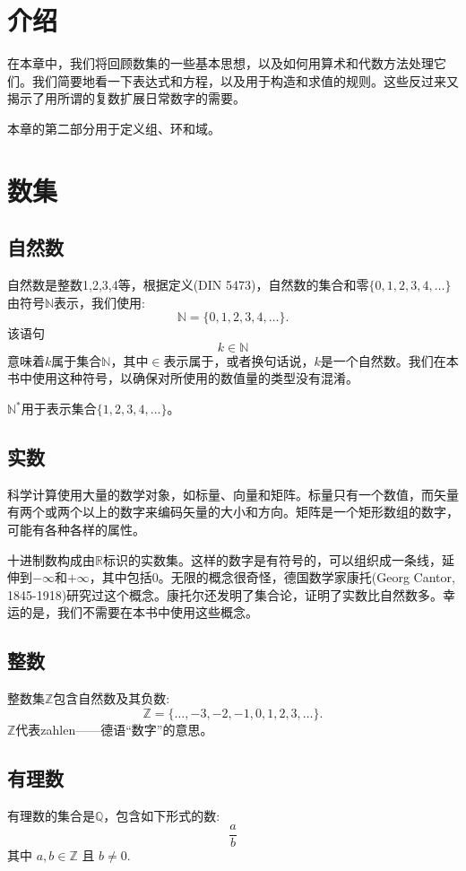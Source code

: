 \section{介绍}
在本章中，我们将回顾数集的一些基本思想，以及如何用算术和代数方法处理它们。我们简要地看一下表达式和方程，以及用于构造和求值的规则。这些反过来又揭示了用所谓的复数扩展日常数字的需要。

本章的第二部分用于定义组、环和域。

\section{数集}
\subsection{自然数}
自然数是整数1,2,3,4等，根据定义(DIN 5473)，自然数的集合和零$\{0,1,2,3,4,\ldots\}$由符号$\mathbb{N}$表示，我们使用:
$$
\mathbb{N}=\{0,1,2,3,4, \ldots\} .
$$
该语句
$$
k \in \mathbb{N}
$$
意味着$k$属于集合$\mathbb{N}$，其中$\in$表示属于，或者换句话说，$k$是一个自然数。我们在本书中使用这种符号，以确保对所使用的数值量的类型没有混淆。

$ \mathbb {N} ^{*}$用于表示集合$\{1,2,3,4,\ldots \} $。

\subsection{实数}
科学计算使用大量的数学对象，如标量、向量和矩阵。标量只有一个数值，而矢量有两个或两个以上的数字来编码矢量的大小和方向。矩阵是一个矩形数组的数字，可能有各种各样的属性。

十进制数构成由$\mathbb{R}$标识的实数集。这样的数字是有符号的，可以组织成一条线，延伸到$-\infty$和$+\infty$，其中包括0。无限的概念很奇怪，德国数学家康托(Georg Cantor, 1845-1918)研究过这个概念。康托尔还发明了集合论，证明了实数比自然数多。幸运的是，我们不需要在本书中使用这些概念。

\subsection{整数}
整数集$\mathbb{Z}$包含自然数及其负数:
$$
\mathbb{Z}=\{\ldots,-3,-2,-1,0,1,2,3, \ldots\} .
$$
$\mathbb{Z}$代表zahlen——德语“数字”的意思。


\subsection{有理数}
有理数的集合是$\mathbb{Q}$，包含如下形式的数:
$$
\frac{a}{b}
$$
其中 $a, b \in \mathbb{Z}$ 且 $b \neq 0$.

